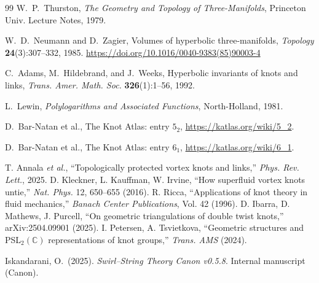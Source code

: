 \documentclass[10pt,reprint,aps,onecolumn,nofootinbib]{revtex4-2}
\begin{document}
            
            \begin{thebibliography}{99}
                W.~P.~Thurston,
                \newblock \emph{The Geometry and Topology of Three-Manifolds},
                \newblock Princeton Univ. Lecture Notes, 1979.

                W.~D.~Neumann and D.~Zagier,
                \newblock Volumes of hyperbolic three-manifolds,
                \newblock \emph{Topology} \textbf{24}(3):307--332, 1985. \url{https://doi.org/10.1016/0040-9383(85)90003-4}

                C.~Adams, M.~Hildebrand, and J.~Weeks,
                \newblock Hyperbolic invariants of knots and links,
                \newblock \emph{Trans. Amer. Math. Soc.} \textbf{326}(1):1--56, 1992.

                L.~Lewin,
                \newblock \emph{Polylogarithms and Associated Functions},
                \newblock North-Holland, 1981.

                D.~Bar-Natan et al.,
                \newblock The Knot Atlas: entry \(5_2\),
                \newblock \url{https://katlas.org/wiki/5_2}.

                D.~Bar-Natan et al.,
                \newblock The Knot Atlas: entry \(6_1\),
                \newblock \url{https://katlas.org/wiki/6_1}.

                 T. Annala \emph{et al.}, ``Topologically protected vortex knots and links,'' \emph{Phys. Rev. Lett.}, 2025.
                 D. Kleckner, L. Kauffman, W. Irvine, ``How superfluid vortex knots untie,'' \emph{Nat. Phys.} 12, 650–655 (2016).
                 R. Ricca, ``Applications of knot theory in fluid mechanics,'' \emph{Banach Center Publications}, Vol. 42 (1996).
                 D. Ibarra, D. Mathews, J. Purcell, ``On geometric triangulations of double twist knots,'' arXiv:2504.09901 (2025).
                 I. Petersen, A. Tsvietkova, ``Geometric structures and PSL$_2(\mathbb{C})$ representations of knot groups,'' \emph{Trans. AMS} (2024).


                Iskandarani, O.\ (2025).
                \emph{Swirl–String Theory Canon v0.5.8}.
                Internal manuscript (Canon).


\end{thebibliography}
\end{document}
